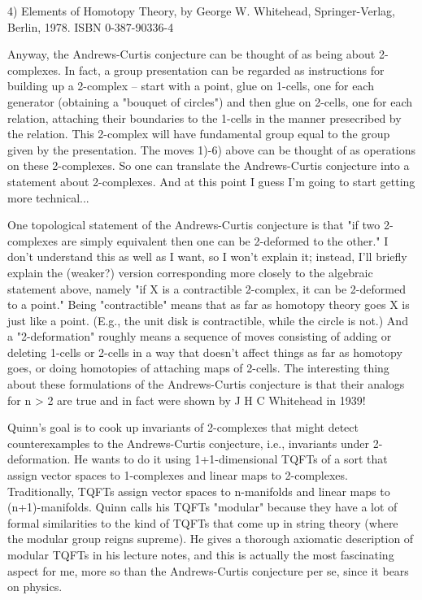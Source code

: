 4) Elements of Homotopy Theory, by George W. Whitehead, Springer-Verlag,
Berlin, 1978.  ISBN 0-387-90336-4

Anyway, the Andrews-Curtis conjecture can be thought of as being about
2-complexes.  In fact, a group presentation can be regarded as
instructions for building up a 2-complex -- start with a point, glue on
1-cells, one for each generator (obtaining a "bouquet of circles") and
then glue on 2-cells, one for each relation, attaching their boundaries
to the 1-cells in the manner presecribed by the relation.  This
2-complex will have fundamental group equal to the group given by the
presentation.  The moves 1)-6) above can be thought of as operations on
these 2-complexes.  So one can translate the Andrews-Curtis conjecture
into a statement about 2-complexes.  And at this point I guess I'm going
to start getting more technical...

One topological statement of the Andrews-Curtis conjecture is that "if
two 2-complexes are simply equivalent then one can be 2-deformed to the
other."  I don't understand this as well as I want, so I won't explain
it; instead, I'll briefly explain the (weaker?) version corresponding
more closely to the algebraic statement above, namely "if X is a
contractible 2-complex, it can be 2-deformed to a point."  Being
"contractible" means that as far as homotopy theory goes X is just like
a point.  (E.g., the unit disk is contractible, while the circle is
not.)  And a "2-deformation" roughly means a sequence of moves
consisting of adding or deleting 1-cells or 2-cells in a way that
doesn't affect things as far as homotopy goes, or doing homotopies of
attaching maps of 2-cells.  The interesting thing about these
formulations of the Andrews-Curtis conjecture is that their analogs for
n > 2 are true and in fact were shown by J H C Whitehead in 1939!

Quinn's goal is to cook up invariants of 2-complexes that might detect
counterexamples to the Andrews-Curtis conjecture, i.e., invariants under
2-deformation.  He wants to do it using 1+1-dimensional TQFTs of a sort
that assign vector spaces to 1-complexes and linear maps to 2-complexes.
Traditionally, TQFTs assign vector spaces to n-manifolds and linear maps to
(n+1)-manifolds.  Quinn calls his TQFTs "modular" because they have a
lot of formal similarities to the kind of TQFTs that come up in string
theory (where the modular group reigns supreme).  He gives a thorough
axiomatic description of modular TQFTs in his lecture notes, and this is
actually the most fascinating aspect for me, more so than the
Andrews-Curtis conjecture per se, since it bears on physics.  

